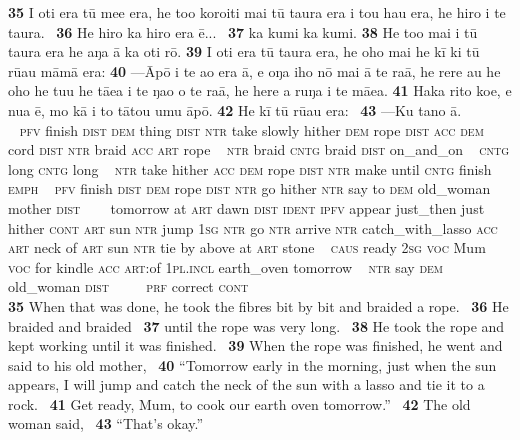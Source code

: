 \bigskip\gll
\textbf{\textup{35}} I oti era tū me{\ꞌ}e era, he to{\ꞌ}o koro{\ꞌ}iti mai tū taura era i tou hau era, he hiro i te taura. ~\textbf{\textup{36}} He hiro ka hiro era ē... ~\textbf{\textup{37}} ka kumi ka kumi. \textbf{\textup{38}} He to{\ꞌ}o mai i tū taura era he aŋa {\ꞌ}ā ka oti rō. \textbf{\textup{39}} I oti era tū taura era, he oho mai he kī ki tū rū{\ꞌ}au māmā era: \textbf{\textup{40}} —\=Apō {\ꞌ}i te {\ꞌ}ao era {\ꞌ}ā, e oŋa iho nō mai {\ꞌ}ā te ra{\ꞌ}ā, he rere au he oho he tu{\ꞌ}u he tāea i te ŋao o te ra{\ꞌ}ā, he here a ruŋa i te mā{\ꞌ}ea. \textbf{\textup{41}} Haka rito koe, e nua ē, mo kā i to tātou {\ꞌ}umu āpō. \textbf{\textup{42}} He kī tū rū{\ꞌ}au era: ~\textbf{\textup{43}} —Ku tano {\ꞌ}ā.\\
~ \textsc{pfv} finish \textsc{dist} \textsc{dem} thing \textsc{dist} \textsc{ntr} take slowly hither \textsc{dem} rope \textsc{dist} \textsc{acc} \textsc{dem} cord \textsc{dist} \textsc{ntr} braid \textsc{acc} \textsc{art} rope ~ \textsc{ntr} braid \textsc{cntg} braid \textsc{dist} on\_and\_on ~ \textsc{cntg} long \textsc{cntg} long ~ \textsc{ntr} take hither \textsc{acc} \textsc{dem} rope \textsc{dist} \textsc{ntr} make until \textsc{cntg} finish \textsc{emph}  ~ \textsc{pfv} finish \textsc{dist} \textsc{dem} rope \textsc{dist} \textsc{ntr} go hither \textsc{ntr} say to \textsc{dem} old\_woman mother \textsc{dist} ~ ~~tomorrow at \textsc{art} dawn \textsc{dist} \textsc{ident} \textsc{ipfv} appear just\_then just hither \textsc{cont} \textsc{art} sun \textsc{ntr} jump \textsc{1sg} \textsc{ntr} go \textsc{ntr} arrive \textsc{ntr} catch\_with\_lasso \textsc{acc} \textsc{art} neck of \textsc{art} sun \textsc{ntr} tie by above at \textsc{art} stone ~ \textsc{caus} ready \textsc{2sg} \textsc{voc} Mum \textsc{voc} for kindle \textsc{acc} \textsc{art}:of \textsc{1pl.incl} earth\_oven tomorrow ~ \textsc{ntr} say \textsc{dem} old\_woman \textsc{dist} ~ ~~~\textsc{prf} correct \textsc{cont}\\
\newpage 
\glt
\textbf{\textup{35}} When that was done, he took the fibres bit by bit and braided a rope. ~\textbf{\textup{36}} He braided and braided ~\textbf{\textup{37}} until the rope was very long. ~\textbf{\textup{38}} He took the rope and kept working until it was finished. ~\textbf{\textup{39}} When the rope was finished, he went and said to his old mother, ~\textbf{\textup{40}} “Tomorrow early in the morning, just when the sun appears, I will jump and catch the neck of the sun with a lasso and tie it to a rock. ~\textbf{\textup{41}} Get ready, Mum, to cook our earth oven tomorrow.” ~\textbf{\textup{42}} The old woman said, ~\textbf{\textup{43}} “That’s okay.”


